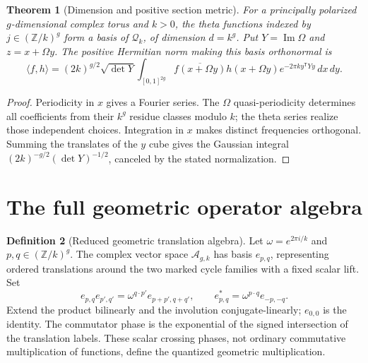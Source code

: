 \documentclass[11pt]{article}
\newtheorem{theorem}{Theorem}[section]
\theoremstyle{definition}
\newtheorem{definition}[theorem]{Definition}
\theoremstyle{remark}
\newcommand{\Z}{\mathbb{Z}}
\begin{document}
\begin{theorem}[Dimension and positive section metric]\label{thm:theta-dimension}
For a principally polarized $g$-dimensional complex torus and $k>0$,
the theta functions indexed by $j\in(\Z/k)^g$ form a basis of
$\mathcal Q_k$, of dimension $d=k^g$. Put $Y=\operatorname{Im}\Omega$ and
$z=x+\Omega y$. The positive Hermitian norm making this basis orthonormal is
\[
 \langle f,h\rangle=(2k)^{g/2}\sqrt{\det Y}
 \int_{[0,1]^{2g}}\overline{f(x+\Omega y)}h(x+\Omega y)
 e^{-2\pi k y^{\mathsf T}Yy}\,dx\,dy.
\]
\end{theorem}
\begin{proof}
Periodicity in $x$ gives a Fourier series. The $\Omega$ quasi-periodicity
determines all coefficients from their $k^g$ residue classes modulo $k$;
the theta series realize those independent choices. Integration in $x$
makes distinct frequencies orthogonal. Summing the translates of the $y$
cube gives the Gaussian integral
$(2k)^{-g/2}(\det Y)^{-1/2}$, canceled by the stated normalization.
\end{proof}

\section{The full geometric operator algebra}\label{sec:operator-algebra}

\begin{definition}[Reduced geometric translation algebra]
Let $\omega=e^{2\pi i/k}$ and $p,q\in(\Z/k)^g$. The complex vector space
$\mathcal A_{g,k}$ has basis $e_{p,q}$, representing ordered translations
around the two marked cycle families with a fixed scalar lift. Set
\[
 e_{p,q}e_{p',q'}=\omega^{q\cdot p'}e_{p+p',q+q'},\qquad
 e_{p,q}^*=\omega^{p\cdot q}e_{-p,-q}.
\]
Extend the product bilinearly and the involution conjugate-linearly;
$e_{0,0}$ is the identity. The commutator phase is the exponential of
the signed intersection of the translation labels. These scalar crossing
phases, not ordinary commutative multiplication of functions, define the
quantized geometric multiplication.
\end{definition}
\end{document}
